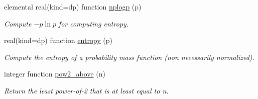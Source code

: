 \begin{DoxyCompactItemize}
elemental real(kind=dp) function \mbox{\hyperlink{namespacepmc__util_a95ad9c9ce574477325505b3e913917cb}{nplogp}} (p)
\begin{DoxyCompactList}\small\item\em Compute $ - p \ln p$ for computing entropy. \end{DoxyCompactList}\item 
real(kind=dp) function \mbox{\hyperlink{namespacepmc__util_af9bd7e3317d4574c2f4633e5f77df142}{entropy}} (p)
\begin{DoxyCompactList}\small\item\em Compute the entropy of a probability mass function (non necessarily normalized). \end{DoxyCompactList}\item 
integer function \mbox{\hyperlink{namespacepmc__util_a1da5df278262d67cfd7576fedea5e9aa}{pow2\+\_\+above}} (n)
\begin{DoxyCompactList}\small\item\em Return the least power-\/of-\/2 that is at least equal to n. \end{DoxyCompactList}\end{DoxyCompactItemize}
